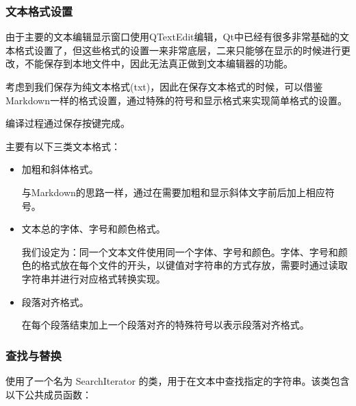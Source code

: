 \documentclass{./source/Report}
\begin{document}
\subsubsection{文本格式设置}
由于主要的文本编辑显示窗口使用QTextEdit编辑，Qt中已经有很多非常基础的文本格式设置了，但这些格式的设置一来非常底层，二来只能够在显示的时候进行更改，不能保存到本地文件中，因此无法真正做到文本编辑器的功能。\par
考虑到我们保存为纯文本格式(txt)，因此在保存文本格式的时候，可以借鉴Markdown一样的格式设置，通过特殊的符号和显示格式来实现简单格式的设置。\par
编译过程通过保存按键完成。\par
主要有以下三类文本格式：
\begin{itemize}
    \item 加粗和斜体格式。\par
    与Markdown的思路一样，通过在需要加粗和显示斜体文字前后加上相应符号。
    \item 文本总的字体、字号和颜色格式。\par
    我们设定为：同一个文本文件使用同一个字体、字号和颜色。字体、字号和颜色的格式放在每个文件的开头，以键值对字符串的方式存放，需要时通过读取字符串并进行对应格式转换实现。
    \item 段落对齐格式。\par
    在每个段落结束加上一个段落对齐的特殊符号以表示段落对齐格式。
\end{itemize}

\subsubsection{查找与替换}
使用了一个名为 SearchIterator 的类，用于在文本中查找指定的字符串。该类包含以下公共成员函数：
\end{document}
